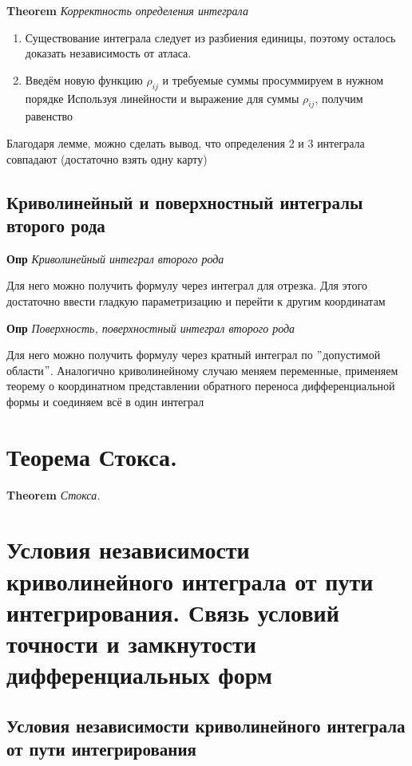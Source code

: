 \documentclass[a4paper, 14pt]{article}
\begin{document}
    \textbf{Theorem} \textit{Корректность определения интеграла}
    
    \begin{enumerate}
        \item Существование интеграла следует из разбиения единицы, поэтому осталось доказать независимость от атласа.
        \item Введём новую функцию $\rho_{ij}$ и требуемые суммы просуммируем в нужном порядке
        Используя линейности и выражение для суммы $\rho_{ij}$, получим равенство
    \end{enumerate}
    
    Благодаря лемме, можно сделать вывод, что определения 2 и 3 интеграла совпадают (достаточно взять одну карту)
    
    \subsection{Криволинейный и поверхностный интегралы второго рода}
    
    \textbf{Опр} \textit{Криволинейный интеграл второго рода}
    
    Для него можно получить формулу через интеграл для отрезка.
    Для этого достаточно ввести гладкую параметризацию и перейти к другим координатам
    
    \textbf{Опр} \textit{Поверхность, поверхностный интеграл второго рода}
    
    Для него можно получить формулу через кратный интеграл по \("\)допустимой области\("\).
    Аналогично криволинейному случаю меняем переменные, применяем теорему о координатном представлении обратного
    переноса дифференциальной формы и соединяем всё в один интеграл
    
    \section{Теорема Стокса.}
    
    \textbf{Theorem} \textit{Стокса. }
    
    \section{Условия независимости криволинейного интеграла от пути интегрирования.
    Связь условий точности и замкнутости дифференциальных форм}
    
    \subsection{Условия независимости криволинейного интеграла от пути интегрирования}
    
\end{document}
